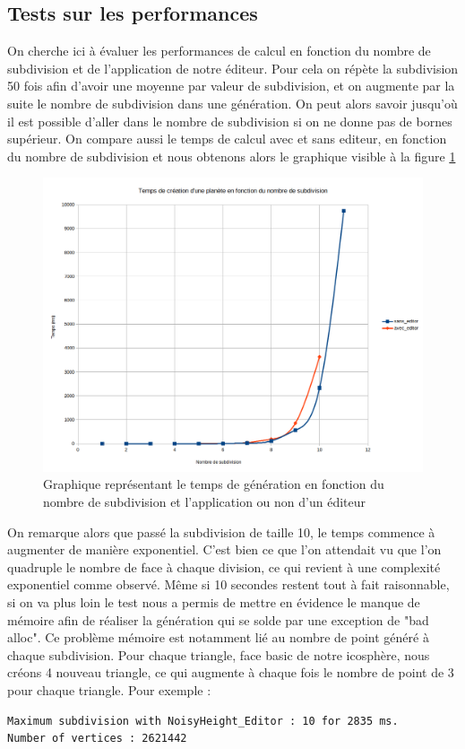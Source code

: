 \documentclass[a4paper]{article}
\begin{document}
\subsection{Tests sur les performances}

On cherche ici à évaluer les performances de calcul en fonction du nombre de subdivision et de l'application de notre éditeur. Pour cela on répète la subdivision 50 fois afin d'avoir une moyenne par valeur de subdivision, et on augmente par la suite le nombre de subdivision dans une génération. On peut alors savoir jusqu'où il est possible d'aller dans le nombre de subdivision si on ne donne pas de bornes supérieur. On compare aussi le temps de calcul avec et sans editeur, en fonction du nombre de subdivision et nous obtenons alors le graphique visible à la figure \ref{graphperf}

\begin{figure}[!ht]
    \begin{center}
        \includegraphics[scale=0.4]{img/perf.png}
        \caption{Graphique représentant le temps de génération en fonction du nombre de subdivision et l'application ou non d'un éditeur}
        \label{graphperf}
    \end{center}
\end{figure}

On remarque alors que passé la subdivision de taille 10, le temps commence à augmenter de manière exponentiel. C'est bien ce que l'on attendait vu que l'on quadruple le nombre de face à chaque division, ce qui revient à une complexité exponentiel comme observé. Même si 10 secondes restent tout à fait raisonnable, si on va plus loin le test nous a permis de mettre en évidence le manque de mémoire afin de réaliser la génération qui se solde par une exception de "bad alloc". Ce problème mémoire est notamment lié au nombre de point généré à chaque subdivision. Pour chaque triangle, face basic de notre icosphère, nous créons 4 nouveau triangle, ce qui augmente à chaque fois le nombre de point de 3 pour chaque triangle.
Pour exemple :
\begin{lstlisting}[caption= Résultat des tests unitaires]
Maximum subdivision with NoisyHeight_Editor : 10 for 2835 ms.
Number of vertices : 2621442
\end{lstlisting}
\end{document}
